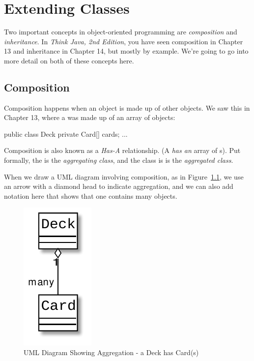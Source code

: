 \chapter{Extending Classes}

Two important concepts in object-oriented programming are {\em composition} and {\em inheritance}. In {\em Think Java, 2nd Edition}, you have seen composition in Chapter 13 and inheritance in Chapter 14, but mostly by example. We're going to go into more detail on both of these concepts here.

\section{Composition}

Composition happens when an object is made up of other objects. We saw this in Chapter 13, where a  was made up of an array of  objects:

\begin{code}
public class Deck {
    private Card[] cards; 
    ...
}
\end{code}

Composition is also known as a {\em Has-A} relationship.  (A  {\em has an} array of s).  Put formally, the  is the {\em aggregating class}, and the  class is is the {\em aggregated class}.

When we draw a UML diagram involving composition, as in Figure~\ref{fig.aggregation}, we use an arrow with a diamond head to indicate aggregation, and we can also add notation here that shows that one  contains many  objects.

\begin{figure}[!ht]
\begin{center}
\includegraphics[scale=0.75]{figs/ch14/aggregation.pdf}
\caption{UML Diagram Showing Aggregation - a Deck has Card(s)}
\label{fig.aggregation}
\end{center}
\end{figure}

